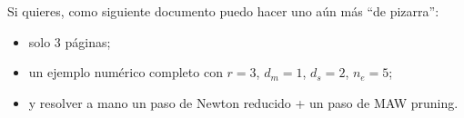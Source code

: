 \documentclass[11pt,a4paper]{article}
\begin{document}
\noindent
Si quieres, como siguiente documento puedo hacer uno aún más ``de pizarra'':
\begin{itemize}[leftmargin=1.5em]
\item solo 3 páginas;
\item un ejemplo numérico completo con $r=3$, $d_m=1$, $d_s=2$, $n_e=5$;
\item y resolver a mano un paso de Newton reducido + un paso de MAW pruning.
\end{itemize}
\end{document}

